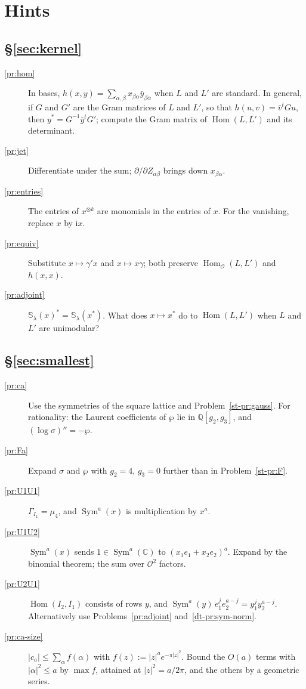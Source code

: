 \documentclass[reqno]{amsart}
\theoremstyle{definition}
\theoremstyle{plain}
\newcommand{\Q}{\mathbb{Q}}
\newcommand{\C}{\mathbb{C}}
\newcommand{\ii}{\mathrm{i}}
\newcommand{\Oc}{\mathcal{O}}
\newcommand{\Sc}{\mathbb{S}}
\newcommand{\Hom}{\operatorname{Hom}}
\newcommand{\Sym}{\operatorname{Sym}}
\begin{document}
\section*{Hints}

\subsection*{\S\ref{sec:kernel}}
\begin{description}
\item[\ref{pr:hom}] In bases, \(h(x,y) = \sum_{\alpha,\beta} x_{\beta\alpha} \bar y_{\beta\alpha}\) when \(L\) and \(L'\) are standard.  In general, if \(G\) and \(G'\) are the Gram matrices of \(L\) and \(L'\), so that \(h(u,v) = \bar v^{t} G u\), then \(y^* = G^{-1}\bar y^{t} G'\); compute the Gram matrix of \(\Hom(L,L')\) and its determinant.
\item[\ref{pr:jet}] Differentiate under the sum; \(\partial/\partial Z_{\alpha\beta}\) brings down \(x_{\beta\alpha}\).
\item[\ref{pr:entries}] The entries of \(x^{\otimes k}\) are monomials in the entries of \(x\).  For the vanishing, replace \(x\) by \(\ii x\).
\item[\ref{pr:equiv}] Substitute \(x \mapsto \gamma' x\) and \(x \mapsto x\gamma\); both preserve \(\Hom_\Oc(L,L')\) and \(h(x,x)\).
\item[\ref{pr:adjoint}] \(\Sc_\lambda(x)^* = \Sc_\lambda(x^*)\).  What does \(x \mapsto x^*\) do to \(\Hom(L,L')\) when \(L\) and \(L'\) are unimodular?
\end{description}

\subsection*{\S\ref{sec:smallest}}
\begin{description}
\item[\ref{pr:ca}] Use the symmetries of the square lattice and Problem~\ref{st-pr:gauss}.  For rationality: the Laurent coefficients of \(\wp\) lie in \(\Q[g_2, g_3]\), and \((\log\sigma)'' = -\wp\).
\item[\ref{pr:Fa}] Expand \(\sigma\) and \(\wp\) with \(g_2 = 4\), \(g_3 = 0\) further than in Problem~\ref{st-pr:F}.
\item[\ref{pr:U1U1}] \(\Gamma_{I_1} = \mu_4\), and \(\Sym^a(x)\) is multiplication by \(x^a\).
\item[\ref{pr:U1U2}] \(\Sym^a(x)\) sends \(1 \in \Sym^a(\C)\) to \((x_1 e_1 + x_2 e_2)^a\).  Expand by the binomial theorem; the sum over \(\Oc^2\) factors.
\item[\ref{pr:U2U1}] \(\Hom(I_2, I_1)\) consists of rows \(y\), and \(\Sym^a(y)\, e_1^j e_2^{a-j} = y_1^j y_2^{a-j}\).  Alternatively use Problems~\ref{pr:adjoint} and~\ref{dt-pr:sym-norm}.
\item[\ref{pr:ca-size}] \(\lvert c_a \rvert \le \sum_\alpha f(\alpha)\) with \(f(z) := \lvert z\rvert^a e^{-\pi\lvert z\rvert^2}\).  Bound the \(O(a)\) terms with \(\lvert\alpha\rvert^2 \le a\) by \(\max f\), attained at \(\lvert z\rvert^2 = a/2\pi\), and the others by a geometric series.
\end{description}
\end{document}
